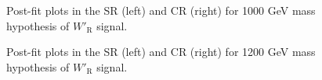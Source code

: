 \begin{figure}[H]
  \centering
  \caption{Post-fit plots in the SR (left) and CR (right) for 1000 GeV mass hypothesis of $W'_{\text{R}}$ signal.}
  \label{fig:Postfit_WpRH1000_Asimov}
\end{figure}
\begin{figure}[H]
  \centering
  \caption{Post-fit plots in the SR (left) and CR (right) for 1200 GeV mass hypothesis of $W'_{\text{R}}$ signal.}
  \label{fig:Postfit_WpRH1200_Asimov}
\end{figure}
